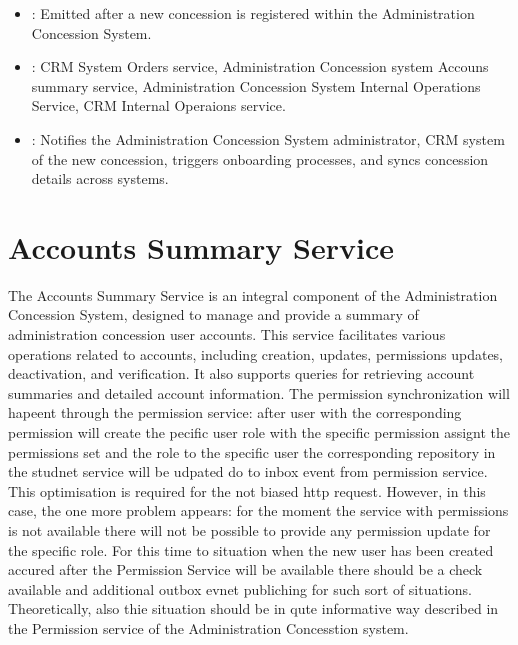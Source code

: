 \documentclass[letterpaper,10pt,english]{sphinxmanual}
\begin{document}
\sphinxAtStartPar
{}
\begin{itemize}
\item {} 
\sphinxAtStartPar
{}: Emitted after a new concession is registered within the Administration Concession System.

\item {} 
\sphinxAtStartPar
{}: CRM System Orders service, Administration Concession system Accouns summary service, Administration Concession System Internal Operations Service, CRM Internal Operaions service.

\item {} 
\sphinxAtStartPar
{}: Notifies the Administration Concession System administrator, CRM system of the new concession, triggers onboarding processes, and syncs concession details across systems.

\end{itemize}

\sphinxstepscope


\section{Accounts Summary Service}
\label{\detokenize{administration_concession_system/accounts_summary_service:accounts-summary-service}}\label{\detokenize{administration_concession_system/accounts_summary_service::doc}}
\sphinxAtStartPar
The Accounts Summary Service is an integral component of the Administration Concession System, designed to manage and provide a summary of administration concession user accounts. This service facilitates various operations related to accounts, including creation, updates, permissions updates, deactivation, and verification. It also supports queries for retrieving account summaries and detailed account information.
The permission synchronization will hapeent through the permission service: after user with the corresponding permission will create the pecific user role with the specific permission assignt the permissions set and the role to the specific user the corresponding repository in the studnet service will be udpated do to inbox event from permission service. This optimisation is required for the not biased http request. However, in this case, the one more problem appears: for the moment the service with permissions is not available there will not be possible to provide any permission update for the specific role. For this time to situation when the new user has been created accured after the Permission Service will be available there should be a check available and additional outbox evnet publiching for such sort of situations. Theoretically, also thie situation should be in qute informative way described in the Permission service of the Administration Concesstion system.
\end{document}
